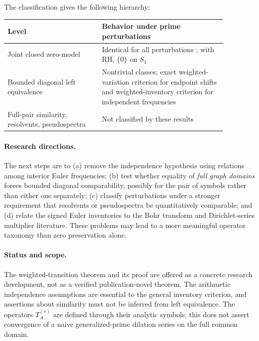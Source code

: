 \documentclass[12pt,letterpaper]{article}
\numberwithin{equation}{section}
\theoremstyle{remark}
\begin{document}
The classification gives the following hierarchy:
\begin{center}
\begin{tabular}{@{}p{0.37\linewidth}p{0.49\linewidth}@{}}
\toprule
\textbf{Level} & \textbf{Behavior under prime perturbations}\\
\midrule
Joint closed zero-model & Identical for all perturbations \cite[Theorem~2.1]{GS26}; with RH, $\{0\}$ on $S_1$\\
Bounded diagonal left equivalence & Nontrivial classes; exact weighted-variation criterion for endpoint shifts and weighted-inventory criterion for independent frequencies\\
Full-pair similarity, resolvents, pseudospectra & Not classified by these results\\
\bottomrule
\end{tabular}
\end{center}

\paragraph{Research directions.} The next steps are to (a) remove the independence hypothesis using relations among interior Euler frequencies; (b) test whether equality of \emph{full graph domains} forces bounded diagonal comparability, possibly for the pair of symbols rather than either one separately; (c) classify perturbations under a stronger requirement that resolvents or pseudospectra be quantitatively comparable; and (d) relate the signed Euler inventories to the Bohr transform and Dirichlet-series multiplier literature. These problems may lead to a more meaningful operator taxonomy than zero preservation alone.

\paragraph{Status and scope.} The weighted-transition theorem and its proof are offered as a concrete research development, not as a verified publication-novel theorem. The arithmetic independence assumptions are essential to the general inventory criterion, and assertions about similarity must not be inferred from left equivalence. The operators $T_A^{(r)}$ are defined through their analytic symbols; this does not assert convergence of a naive generalized-prime dilation series on the full common domain.
\end{document}
